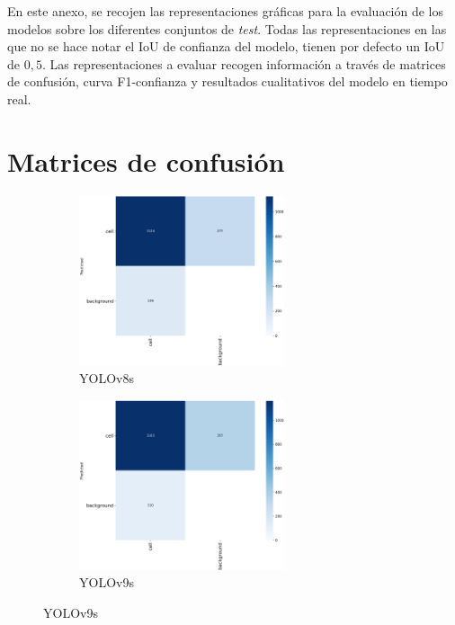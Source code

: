 \documentclass[12pt,a4paper,onecolumn,oneside]{report}
\begin{document}
En este anexo, se recojen las representaciones gráficas para la evaluación de los modelos sobre los diferentes conjuntos de \textit{test}. Todas las representaciones en las que no se hace notar el IoU
de confianza del modelo, tienen por defecto un IoU de $0,5$. Las representaciones a evaluar recogen información a través de matrices de confusión, curva F1-confianza y resultados cualitativos del modelo en tiempo real.

\section{Matrices de confusión}
\label{sec:Matrice de confusión}

\begin{figure}[H]
  \centering
  \vspace{-0.3cm}
  \begin{subfigure}[b]{0.45\textwidth}
    \centering
    \includegraphics[height=5cm]{figuras/resultados experimentacion/yolov8s/original_test/confusion_matrix.png}
    \vspace{-0.3cm}
    \caption{\footnotesize YOLOv8s}
    \label{fig:confusion_yolov8s_original_test}
  \end{subfigure}
  \hfill
  \begin{subfigure}[b]{0.45\textwidth}
    \centering
    \includegraphics[height=5cm]{figuras/resultados experimentacion/yolov9s/original_test/confusion_matrix.png}
    \vspace{-0.3cm}
    \caption{\footnotesize YOLOv9s}
    \label{fig:confusion_yolov9s_original_test}
  \end{subfigure}
  

\end{figure}
\end{document}
